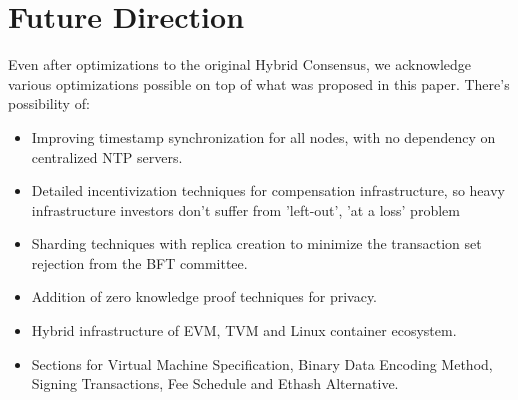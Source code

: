\section{Future Direction}

Even after optimizations to the original Hybrid Consensus, we acknowledge various optimizations possible on top of what was
proposed in this paper. There's possibility of:

\begin{itemize}
  \item Improving timestamp synchronization for all nodes, with no dependency on centralized NTP servers.
  \item Detailed incentivization techniques for compensation infrastructure, so heavy infrastructure investors don't suffer from 'left-out', 'at a loss' problem
  \item Sharding techniques with replica creation to minimize the transaction set rejection from the BFT committee.
  \item Addition of zero knowledge proof techniques for privacy.
  \item Hybrid infrastructure of EVM, TVM and Linux container ecosystem.
  \item Sections for Virtual Machine Specification, Binary Data Encoding Method, Signing Transactions, Fee Schedule and Ethash Alternative.
\end{itemize}
